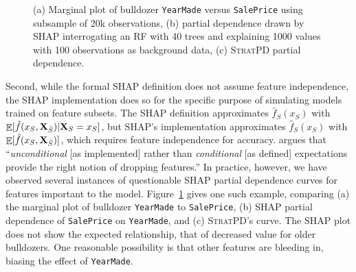 \documentclass[11pt]{article}
\newcommand{\figref}[1]{Figure~\ref{#1}}
\DeclareMathOperator{\Ex}{\mathbb{E}}
\newcommand{\spd}{\fontfamily{cmr}\textsc{\small StratPD}}
\begin{document}
\begin{figure}[htbp]
\begin{center}
\caption{\small (a) Marginal plot of bulldozer {\tt YearMade} versus {\tt SalePrice} using subsample of 20k observations, (b) partial dependence drawn by SHAP interrogating an RF with 40 trees and explaining 1000 values with 100 observations as background data, (c) \spd{} partial dependence.}
\label{fig:shap-stratpd-YearMade}
\end{center}
\end{figure}

Second, while the formal SHAP definition does not assume feature independence, the SHAP implementation does so for the specific purpose of simulating models trained on feature subsets. The SHAP definition approximates $\hat{f}_S(x_S)$ with $\Ex[\hat{f}(x_{S},{\bf X}_{\bar{S}}) | {\bf X}_S = x_S]$, but SHAP's implementation approximates $\hat{f}_S(x_S)$ with $\Ex[\hat{f}(x_{S},{\bf X}_{\bar{S}})]$, which requires feature independence for accuracy. \cite{janzing2019feature} argues that ``{\em unconditional} [as implemented] rather than {\em conditional} [as defined] expectations provide the right notion of dropping features.'' In practice, however, we have observed several instances of questionable SHAP partial dependence curves for features important to the model.  \figref{fig:shap-stratpd-YearMade} gives one such example, comparing (a) the marginal plot of  bulldozer {\tt YearMade} to {\tt SalePrice}, (b) SHAP partial dependence of {\tt SalePrice} on {\tt YearMade}, and (c) \spd{}'s curve. The SHAP plot does not show the expected relationship, that of decreased value for older bulldozers. One reasonable possibility is that other features are bleeding in, biasing the effect of {\tt YearMade}.
\end{document}
